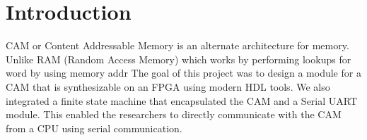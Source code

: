 \section{Introduction}
CAM or Content Addressable Memory is an alternate architecture for memory. Unlike RAM (Random Access Memory) which works by performing lookups for word by using memory addr
The goal of this project was to design a module for a CAM that is synthesizable on an FPGA using modern HDL tools. 
We also integrated a finite state machine that encapsulated the CAM and a Serial UART module. 
This enabled the researchers to directly communicate with the CAM from a CPU using serial communication. 
